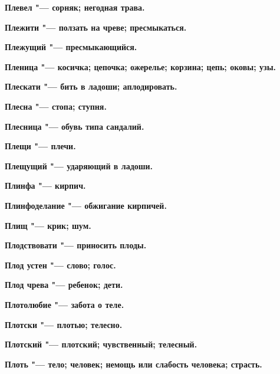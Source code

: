 \bfseries Плевел \normalfont{} "--- сорняк; негодная трава. 




\bfseries Плежити \normalfont{} "--- ползать на чреве; пресмыкаться. 




\bfseries Плежущий \normalfont{} "--- пресмыкающийся. 




\bfseries Пленица \normalfont{} "--- косичка; цепочка; ожерелье; корзина; цепь; оковы; узы. 




\bfseries Плескати \normalfont{} "--- бить в ладоши; аплодировать. 




\bfseries Плесна \normalfont{} "--- стопа; ступня. 




\bfseries Плесница \normalfont{} "--- обувь типа сандалий. 




\bfseries Плещи \normalfont{} "--- плечи. 




\bfseries Плещущий \normalfont{} "--- ударяющий в ладоши. 




\bfseries Плинфа \normalfont{} "--- кирпич. 




\bfseries Плинфоделание \normalfont{} "--- обжигание кирпичей. 




\bfseries Плищ \normalfont{} "--- крик; шум. 




\bfseries Плодствовати \normalfont{} "--- приносить плоды. 




\bfseries Плод устен \normalfont{} "--- слово; голос. 




\bfseries Плод чрева \normalfont{} "--- ребенок; дети. 




\bfseries Плотолюбие \normalfont{} "--- забота о теле. 




\bfseries Плотски \normalfont{} "--- плотью; телесно. 




\bfseries Плотский \normalfont{} "--- плотский; чувственный; телесный. 




\bfseries Плоть \normalfont{} "--- тело; человек; немощь или слабость человека; страсть. 





